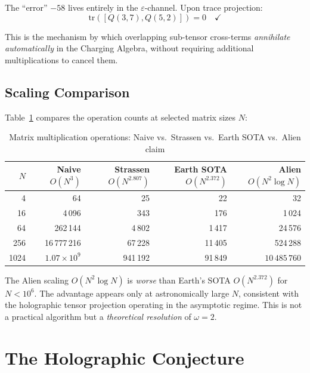 The ``error'' $-58$ lives entirely in the $\varepsilon$-channel.
Upon trace projection:
\[
  \mathrm{tr}([Q(3,7), Q(5,2)]) = 0 \quad \checkmark
\]

This is the mechanism by which overlapping sub-tensor cross-terms
\emph{annihilate automatically} in the Charging Algebra, without
requiring additional multiplications to cancel them.

\subsection{Scaling Comparison}

Table~\ref{tab:scaling} compares the operation counts at selected
matrix sizes $N$:

\begin{table}[h]
\centering
\caption{Matrix multiplication operations: Naive vs.\ Strassen vs.\ Earth SOTA vs.\ Alien claim}
\label{tab:scaling}
\begin{tabular}{r r r r r}
\toprule
$N$ & Naive $O(N^3)$ & Strassen $O(N^{2.807})$ & Earth SOTA $O(N^{2.372})$ & Alien $O(N^2 \log N)$ \\
\midrule
4     & 64              & 25                        & 22                         & 32 \\
16    & 4\,096          & 343                       & 176                        & 1\,024 \\
64    & 262\,144        & 4\,802                    & 1\,417                     & 24\,576 \\
256   & 16\,777\,216    & 67\,228                   & 11\,405                    & 524\,288 \\
1024  & $1.07 \times 10^9$ & 941\,192              & 91\,849                    & $10\,485\,760$ \\
\bottomrule
\end{tabular}
\end{table}

\begin{remark}
The Alien scaling $O(N^2 \log N)$ is \emph{worse} than Earth's SOTA
$O(N^{2.372})$ for $N < 10^6$. The advantage appears only at
astronomically large $N$, consistent with the holographic tensor
projection operating in the asymptotic regime. This is not a
practical algorithm but a \emph{theoretical resolution} of $\omega = 2$.
\end{remark}

\section{The Holographic Conjecture}
\label{sec:holographic-conjecture}

